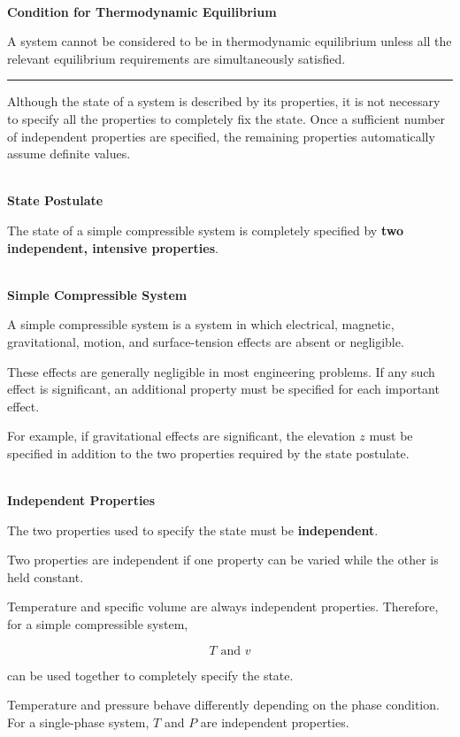 \documentclass[12pt]{article}
\newcommand{\mysubsection}[2]{%
    \noindent{\headingfont\large #1\space #2\par}
    \vspace{4pt}
    \hrule
    \vspace{15pt}
}
\begin{document}
\textbf{\\ Condition for Thermodynamic Equilibrium}

A system cannot be considered to be in thermodynamic equilibrium unless all the relevant equilibrium requirements are simultaneously satisfied.

\mysubsection{}{The State Postulate}

Although the state of a system is described by its properties, it is not necessary to specify all the properties to completely fix the state. Once a sufficient number of independent properties are specified, the remaining properties automatically assume definite values.

\textbf{\\ State Postulate}

The state of a simple compressible system is completely specified by \textbf{two independent, intensive properties}.

\textbf{\\ Simple Compressible System}

A simple compressible system is a system in which electrical, magnetic, gravitational, motion, and surface-tension effects are absent or negligible.

These effects are generally negligible in most engineering problems. If any such effect is significant, an additional property must be specified for each important effect.

For example, if gravitational effects are significant, the elevation $z$ must be specified in addition to the two properties required by the state postulate.

\textbf{\\ Independent Properties}

The two properties used to specify the state must be \textbf{independent}.

Two properties are independent if one property can be varied while the other is held constant.

Temperature and specific volume are always independent properties. Therefore, for a simple compressible system,

\begin{equation*}
    T \text{ and } v
\end{equation*}

can be used together to completely specify the state.

Temperature and pressure behave differently depending on the phase condition. For a single-phase system, $T$ and $P$ are independent properties.
\end{document}
